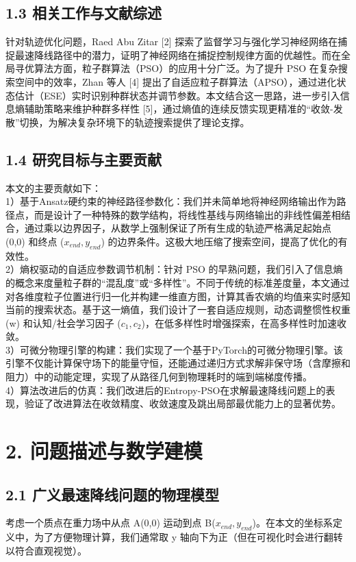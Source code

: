 \documentclass[twocolumn, 12pt]{article} %
\begin{document}
	\subsection{1.3 相关工作与文献综述}
	针对轨迹优化问题，Raed Abu Zitar [2] 探索了监督学习与强化学习神经网络在捕捉最速降线路径中的潜力，证明了神经网络在捕捉控制规律方面的优越性。而在全局寻优算法方面，粒子群算法（PSO）的应用十分广泛。为了提升 PSO 在复杂搜索空间中的效率，Zhan 等人 [4] 提出了自适应粒子群算法（APSO），通过进化状态估计（ESE）实时识别种群状态并调节参数。本文结合这一思路，进一步引入信息熵辅助策略来维护种群多样性 [5]，通过熵值的连续反馈实现更精准的“收敛-发散”切换，为解决复杂环境下的轨迹搜索提供了理论支撑。
	
	\subsection{1.4 研究目标与主要贡献}
	本文的主要贡献如下：\\
	1）基于Ansatz硬约束的神经路径参数化：我们并未简单地将神经网络输出作为路径点，而是设计了一种特殊的数学结构，将线性基线与网络输出的非线性偏差相结合，通过乘以边界因子，从数学上强制保证了所有生成的轨迹严格满足起始点 (0,0) 和终点 ($x_{end}, y_{end}$) 的边界条件。这极大地压缩了搜索空间，提高了优化的有效性。\\
	2）熵权驱动的自适应参数调节机制：针对 PSO 的早熟问题，我们引入了信息熵的概念来度量粒子群的“混乱度”或“多样性”。不同于传统的标准差度量，本文通过对各维度粒子位置进行归一化并构建一维直方图，计算其香农熵的均值来实时感知当前的搜索状态。基于这一熵值，我们设计了一套自适应规则，动态调整惯性权重 (w) 和认知/社会学习因子 ($c_1, c_2$)，在低多样性时增强探索，在高多样性时加速收敛。\\
	3）可微分物理引擎的构建：我们实现了一个基于PyTorch的可微分物理引擎。该引擎不仅能计算保守场下的能量守恒，还能通过递归方式求解非保守场（含摩擦和阻力）中的动能定理，实现了从路径几何到物理耗时的端到端梯度传播。\\
	4）算法改进后的仿真：我们改进后的Entropy-PSO在求解最速降线问题上的表现，验证了改进算法在收敛精度、收敛速度及跳出局部最优能力上的显著优势。
	
	\section{2. 问题描述与数学建模}
	\subsection{2.1 广义最速降线问题的物理模型}
	考虑一个质点在重力场中从点 A(0,0) 运动到点 B($x_{end}, y_{end}$)。在本文的坐标系定义中，为了方便物理计算，我们通常取 y 轴向下为正（但在可视化时会进行翻转以符合直观视觉）。
	
\end{document}
